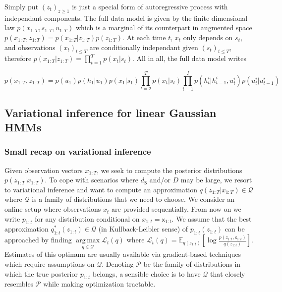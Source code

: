 \documentclass{article}
\newcommand{\1}{\mathbbm{1}}
\newcommand{\expect}[2]{\mathbb{E}_{#1}\left[#2\right]}
\DeclareMathOperator*{\argmax}{arg\,max}
\begin{document}
Simply put $(z_t)_{z \geq 1}$ is just a special form of autoregressive process with independant components. The full data model is given by the finite dimensional law $p(x_{1:T}, s_{1:T}, u_{1:T})$ which is a marginal of its counterpart in augmented space $p(x_{1:T}, z_{1:T}) = p(x_{1:T} \vert z_{1:T})p(z_{1:T})$. At each time $t$, $x_t$ only depends on $s_t$, and observations $(x_t)_{t \leq T}$ are conditionally independant given $(s_t)_{t \leq T}$, therefore $p(x_{1:T} \vert z_{1:T}) = \prod_{t=1}^T p(x_t|s_t)$. All in all, the full data model writes


\begin{equation}\label{full_model}
    p(x_{1:T}, z_{1:T}) = p(u_1)p(h_1|u_1) p(x_1|s_1) \prod_{t=2}^T p(x_t|s_t) \prod_{i=1}^I p(h_t^i|h_{t-1}^i,u_t^i)p(u_t^i|u_{t-1}^i)
\end{equation} 

\subsection{Variational inference for linear Gaussian HMMs}\label{linear_gauss}
\subsubsection*{Small recap on variational inference}
Given observation vectors $x_{1:T}$, we seek to compute the posterior distributions $p( z_{1:T}|x_{1:T})$. To cope with scenarios where $d_{\mathsf{S}}$ and/or $D$ may be large, we resort to variational inference and want to compute an approximation $q( z_{1:T}|x_{1:T}) \in \mathcal{Q}$ where $\mathcal{Q}$ is a family of distributions that we need to choose. 
We consider an online setup where observations $x_t$ are provided sequentially. From now on we write $p_{1:t}$ for any distribution conditional on $x_{1:t} = \mathsf{x}_{1:t}$. We assume that the best approximation $q_{1:t}^*(z_{1:t}) \in \mathcal{Q}$ (in Kullback-Leibler sense) of $p_{1:t}( z_{1:t})$ can be approached by finding $\argmax\limits_{q \in \mathcal{Q}} \mathcal{L}_t(q)$ where $\mathcal{L}_t(q) = \expect{q(z_{1:t})}{\log\frac{p(z_{1:t}, \mathsf{x}_{1:t})}{q(z_{1:t})}}$. 
Estimates of this optimum are usually available via gradient-based techniques which require assumptions on $\mathcal{Q}$. 
Denoting $\mathcal{P}$ be the family of distributions in which the true posterior $p_{1:t}$ belongs, a sensible choice is to have $\mathcal{Q}$ that closely resembles $\mathcal{P}$ while making optimization tractable. 
\end{document}
